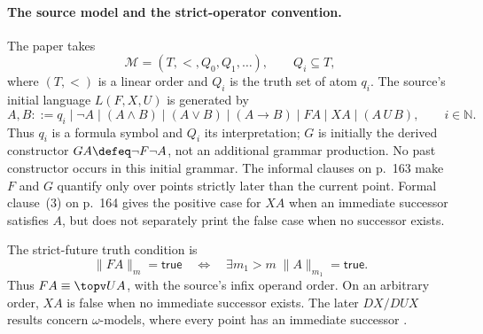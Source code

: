 \paragraph{The source model and the strict-operator convention.}
The paper takes
\[
 \mathcal M=(T,<,Q_0,Q_1,\ldots),
 \qquad Q_i\subseteq T,
\]
where \((T,<)\) is a linear order and \(Q_i\) is the truth set of atom
\(q_i\).  The source's initial language \(L(F,X,U)\) is generated by
\[
 A,B::=q_i\mid\neg A\mid(A\land B)\mid(A\lor B)\mid(A\to B)
       \mid FA\mid XA\mid(A\,U\,B),
 \qquad i\in\mathbb N.
\]
Thus \(q_i\) is a formula symbol and \(Q_i\) its interpretation; \(G\) is
initially the derived constructor \(GA\defeq\neg F\neg A\), not an additional
grammar production.  No past constructor occurs in this initial grammar.
The informal clauses on p.~163 make \(F\) and \(G\) quantify only
over points strictly later than the current point.  Formal clause~(3) on
p.~164 gives the positive case for \(XA\) when an immediate successor satisfies
\(A\), but does not separately print the false case when no successor exists.

The strict-future truth condition is
\[
 \lVert FA\rVert_m=\mathsf{true}
 \quad\Longleftrightarrow\quad
 \exists m_1>m\;\lVert A\rVert_{m_1}=\mathsf{true}.
\]
Thus \(FA\equiv\topv U A\), with the source's infix operand order.
On an arbitrary order, \(XA\) is false when no immediate successor
exists. The later \(DX/DUX\) results concern \(\omega\)-models, where
every point has an immediate successor
\cite[pp.~163--164]{GabbayPnueliShelahStavi1980}.

